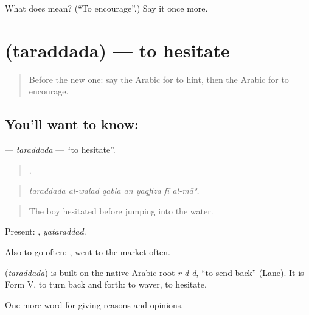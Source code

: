 \begin{tcolorbox}[breakable,colback=teal!4,colframe=teal!35!black,title={Before you move on}]
What does  mean? (\textquotedblleft{}To encourage\textquotedblright{}.) Say it once more.
\end{tcolorbox}
\section[\texorpdfstring{\ar{تردد} (taraddada)}{تردد (taraddada)}]{ (taraddada) — to hesitate}

\label{lesson:AR-C369-taraddada}



\begin{quote}
Before the new one: say the Arabic for to hint, then the Arabic for to encourage.
\end{quote}

\subsection*{You'll want to know: }
\textbf{} — \emph{taraddada} — \textquotedblleft{}to hesitate\textquotedblright{}.

\begin{quote}
      .
\end{quote}

\begin{quote}
\emph{taraddada al-walad qabla an yaqfiza fī al-māʾ.}
\end{quote}

\begin{quote}
The boy hesitated before jumping into the water.
\end{quote}

Present: , \emph{yataraddad}.

Also to go often:   , went to the market often.

\begin{cousinweb}
\textbf{} (\emph{taraddada}) is built on the native Arabic root \emph{r-d-d}, \textquotedblleft{}to send back\textquotedblright{} (Lane). It is Form V, to turn back and forth: to waver, to hesitate.
\end{cousinweb}

\begin{grammarlens}[title={What you've built}]
One more word for giving reasons and opinions.
\end{grammarlens}

